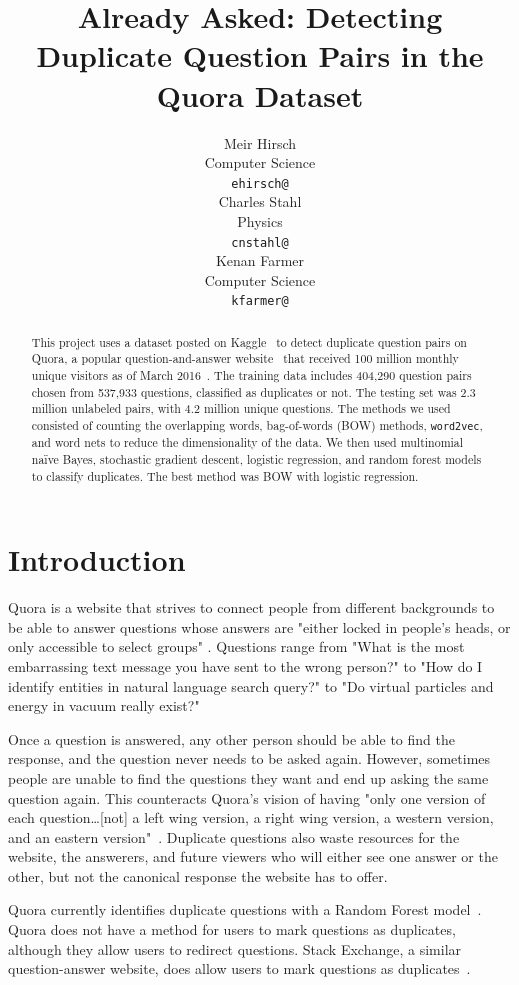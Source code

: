 \documentclass{article} %
\title{Already Asked: Detecting Duplicate Question Pairs in the Quora Dataset}
\author{
Meir Hirsch \\
Computer Science\\
\texttt{ehirsch@} \\
\And
Charles Stahl \\
Physics \\
\texttt{cnstahl@} \\
\And
Kenan Farmer\\
Computer Science \\
\texttt{kfarmer@}\\
}
\newcommand{\wordtvec}{\texttt{word2vec}}
\begin{document}
\maketitle

\begin{abstract}
This project uses a dataset posted on Kaggle~\cite{kaggleComp} to detect duplicate question pairs on Quora, a popular question-and-answer website~\cite{quora} that received 100 million monthly unique visitors as of March 2016~\cite{qvisit}. The training data includes 404,290 question pairs chosen from 537,933 questions, classified as duplicates or not. The testing set was 2.3 million unlabeled pairs, with 4.2 million unique questions. The methods we used consisted of counting the overlapping words, bag-of-words (BOW) methods, \wordtvec, and word nets to reduce the dimensionality of the data. We then used multinomial na\"ive Bayes, stochastic gradient descent, logistic regression, and random forest models to classify duplicates. The best method was BOW with logistic regression.
\end{abstract}

\section{Introduction}

Quora is a website that strives to connect people from different backgrounds to be able to answer questions whose answers are "either locked in people’s heads, or only accessible to select groups" \cite{quora}. Questions range from "What is the most embarrassing text message you have sent to the wrong person?" to "How do I identify entities in natural language search query?" to "Do virtual particles and energy in vacuum really exist?"

Once a question is answered, any other person should be able to find the response, and the question never needs to be asked again. However, sometimes people are unable to find the questions they want and end up asking the same question again. This counteracts Quora's vision of having "only one version of each question\dots [not] a left wing version, a right wing version, a western version, and an eastern version"~\cite{quora}. Duplicate questions also waste resources for the website, the answerers, and future viewers who will either see one answer or the other, but not the canonical response the website has to offer.

Quora currently identifies duplicate questions with a Random Forest model~\cite{kaggleComp}. Quora does not have a method for users to mark questions as duplicates, although they allow users to redirect questions. Stack Exchange, a similar question-answer website, does allow users to mark questions as duplicates~\cite{stackdup}. 
\end{document}
